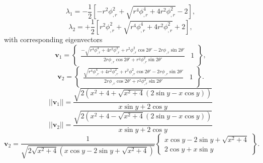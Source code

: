 \documentclass[12pt]{article}
\begin{document}
\begin{equation}
	\lambda_1 = - \frac{1}{2} \left[ - r^2 \phi_{,r}^2 + \sqrt{r^4 \phi_{,r}^4 + 4 r^2 \phi_{,r}^2} - 2 \right],
\end{equation}
\begin{equation}
	\lambda_2 = + \frac{1}{2} \left[ r^2 \phi_{,r}^2 + \sqrt{r^4 \phi_{,r}^4 + 4 r^2 \phi_{,r}^2} + 2 \right],
\end{equation}
with corresponding eigenvectors
\begin{equation}
	\mathbf{v}_1 = \left\{ \begin{array}{cc} \frac{-\sqrt{r^4 \phi_{,r}^4 + 4 r^2 \phi_{,r}^2} + r^2 \phi_{,r}^2 \cos 2 \theta' - 2 r \phi_{,r} \sin 2 \theta'}{2 r \phi_{,r} \cos 2 \theta' + r^2 \phi_{,r}^2 \sin 2 \theta'} & 1 \end{array} \right\},
\end{equation}
\begin{equation}
	\mathbf{v}_2 = \left\{ \begin{array}{cc} \frac{\sqrt{r^4 \phi_{,r}^4 + 4 r^2 \phi_{,r}^2} + r^2 \phi_{,r}^2 \cos 2 \theta' - 2 r \phi_{,r} \sin 2 \theta'}{2 r \phi_{,r} \cos 2 \theta' + r^2 \phi_{,r}^2 \sin 2 \theta'} & 1 \end{array} \right\}.
\end{equation}
\begin{equation}
	|| \mathbf{v}_1 || = \frac{\sqrt{2 (x^2 + 4 + \sqrt{x^2+4} (2 \sin y - x \cos y))}}{x \sin y + 2 \cos y}
\end{equation}
\begin{equation}
	|| \mathbf{v}_2 || = \frac{\sqrt{2 (x^2 + 4 - \sqrt{x^2+4} (2 \sin y - x \cos y))}}{x \sin y + 2 \cos y}
\end{equation}
\begin{equation}
	\mathbf{v}_2 = \frac{1}{\sqrt{2 \sqrt{x^2+4} (x \cos y - 2 \sin y + \sqrt{x^2+4})}} \left\{ \begin{array}{c} x \cos y - 2 \sin y + \sqrt{x^2 + 4} \\ 2 \cos y + x \sin y \end{array} \right\}.
\end{equation}
\end{document}
